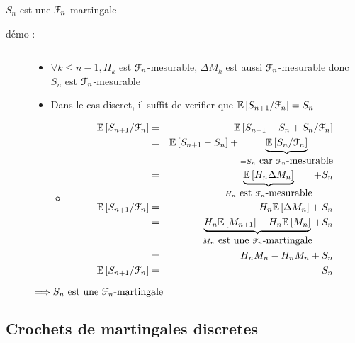 \documentclass{report}
\begin{document}
$S_n$ est une $\EuScript{F}_n$-martingale 
\begin{description}
    \item [démo : ]$\ $
    \begin{itemize}
        \item $\forall k \leq n-1, H_k$ est $\EuScript{F}_n$-mesurable, $\Delta M_k$ est aussi  $\EuScript{F}_n$-mesurable donc \underline{$S_n$ est $\EuScript{F}_n$-mesurable}
        \item Dans le cas discret, il suffit de verifier que $\mathbb{E}\left[S_{n+1}/\EuScript{F}_n\right] = S_n$
        \begin{itemize}$\hookrightarrow$
        \item \begin{eqnarray}
        \mathbb{E}\left[S_{n+1}/\EuScript{F}_n\right] & = & \mathbb{E}\left[S_{n+1} -S_n + S_n/\EuScript{F}_n\right]\nonumber\\
        & = & \mathbb{E}\left[S_{n+1} -S_n\right] + \underbrace{\mathbb{E}\left[S_n/\EuScript{F}_n\right]}_{=S_n \mbox{ car } \EuScript{F}_n\mbox{-mesurable}}\nonumber\\
        & = & \underbrace{\mathbb{E}\left[H_n\Delta M_n\right]}_{H_n \mbox{ est } \EuScript{F}_n\mbox{-mesurable}} +S_n\nonumber\\
        \mathbb{E}\left[S_{n+1}/\EuScript{F}_n\right] & = &  H_n\mathbb{E}\left[\Delta M_n\right] +S_n\nonumber\\
        & = &  \underbrace{H_n\mathbb{E}\left[M_{n+1}\right]-H_n\mathbb{E}\left[ M_n\right]}_{M_n \mbox{ est une } \EuScript{F}_n\mbox{-martingale}}  +S_n\nonumber\\
        & = & H_nM_n-H_nM_n+S_n \nonumber \\
        \mathbb{E}\left[S_{n+1}/\EuScript{F}_n\right] & = & S_n \nonumber
        \end{eqnarray}

    \end{itemize}
    \end{itemize}
    \begin{center}
            $\Longrightarrow {S_n \mbox{ est une } \EuScript{F}_n\mbox{-martingale}}$
        \end{center}
\end{description}

\subsection{Crochets de martingales discretes}
\end{document}
